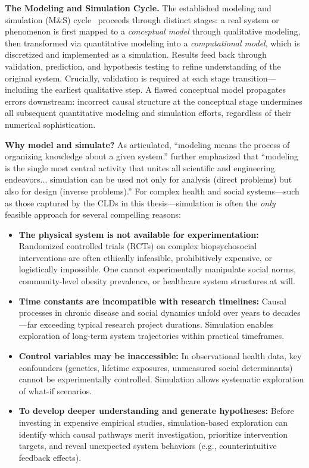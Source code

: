 \medskip
\noindent
\textbf{The Modeling and Simulation Cycle.} The established modeling and simulation (M\&S) cycle~\citep{ziegler1976theory, cellier1990continuous} proceeds through distinct stages: a real system or phenomenon is first mapped to a \emph{conceptual model} through qualitative modeling, then transformed via quantitative modeling into a \emph{computational model}, which is discretized and implemented as a simulation. Results feed back through validation, prediction, and hypothesis testing to refine understanding of the original system. Crucially, validation is required at each stage transition—including the earliest qualitative step. A flawed conceptual model propagates errors downstream: incorrect causal structure at the conceptual stage undermines all subsequent quantitative modeling and simulation efforts, regardless of their numerical sophistication.

\medskip
\noindent
\textbf{Why model and simulate?} As \citet{ziegler1976theory} articulated, ``modeling means the process of organizing knowledge about a given system.'' \citet{cellier1990continuous} further emphasized that ``modeling is the single most central activity that unites all scientific and engineering endeavors... simulation can be used not only for analysis (direct problems) but also for design (inverse problems).'' For complex health and social systems---such as those captured by the CLDs in this thesis---simulation is often the \emph{only} feasible approach for several compelling reasons:

\begin{itemize}
    \item \textbf{The physical system is not available for experimentation:} Randomized controlled trials (RCTs) on complex biopsychosocial interventions are often ethically infeasible, prohibitively expensive, or logistically impossible. One cannot experimentally manipulate social norms, community-level obesity prevalence, or healthcare system structures at will.
    \item \textbf{Time constants are incompatible with research timelines:} Causal processes in chronic disease and social dynamics unfold over years to decades---far exceeding typical research project durations. Simulation enables exploration of long-term system trajectories within practical timeframes.
    \item \textbf{Control variables may be inaccessible:} In observational health data, key confounders (genetics, lifetime exposures, unmeasured social determinants) cannot be experimentally controlled. Simulation allows systematic exploration of what-if scenarios.
    \item \textbf{To develop deeper understanding and generate hypotheses:} Before investing in expensive empirical studies, simulation-based exploration can identify which causal pathways merit investigation, prioritize intervention targets, and reveal unexpected system behaviors (e.g., counterintuitive feedback effects).
\end{itemize}

